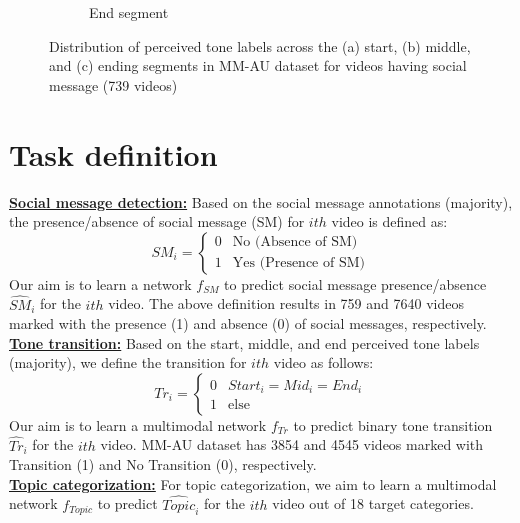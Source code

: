 \begin{figure}
\begin{subfigure}{.33\textwidth}
  \caption{End segment}
  \label{end_tone_social_message}
\end{subfigure}
\caption{Distribution of perceived tone labels across the (a) start, (b) middle, and (c) ending segments in MM-AU dataset for videos having social message (739 videos) }
\label{start_mid_end_soc_msg_tone}
\end{figure}



\section{Task definition}
\textbf{\underline{Social message detection:}}
Based on the social message annotations (majority), the presence/absence of social message (SM) for $ith$ video is defined as:
\begin{equation}
  SM_{i} =
    \begin{cases}
      0 & \text{No (Absence of SM)}\\
      1 & \text{Yes (Presence of SM)}
    \end{cases}       
\end{equation}
Our aim is to learn a network $f_{SM}$ to predict social message presence/absence $\hat{SM}_{i}$ for the $ith$ video. The above definition results in 759 and 7640 videos marked with the presence  (1) and absence (0) of social messages, respectively.\\
\textbf{\underline{Tone transition:}}
Based on the start, middle, and end perceived tone labels (majority), we define the transition for $ith$ video as follows:
\begin{equation}
  Tr_{i} =
    \begin{cases}
      0 & \text{$Start_{i}=Mid_{i}=End_{i}$}\\
      1 & \text{else}
    \end{cases}       
\end{equation}
Our aim is to learn a multimodal network $f_{Tr}$ to predict binary tone transition $\hat{Tr}_{i}$ for the $ith$ video.
MM-AU dataset has 3854 and 4545 videos marked with Transition (1) and No Transition (0), respectively.\\
\textbf{\underline{Topic categorization:}}
For topic categorization, we aim to learn a multimodal network $f_{Topic}$ to predict $\hat{Topic}_{i}$ for the $ith$ video out of 18 target categories. 
